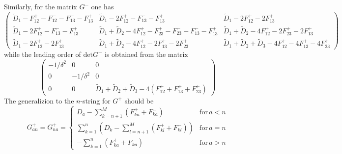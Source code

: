 \documentclass[onecolumn,superscriptaddress,pr]{revtex4}
\begin{document}
% 
Similarly, for the matrix $G^-$ one has 
%
\begin{equation}
\left(\begin{array}{ccc}
\tilde D_1-F_{12}^+-F_{12}^--F_{13}^--F_{13}^+   &    \tilde D_1-2F_{12}^+-F_{13}^--F_{13}^+                                      &   \tilde D_1-2F_{12}^+-2F_{13}^+\\
\tilde D_1-2F_{12}^+-F_{13}^--F_{13}^+           &    \tilde D_1+\tilde D_2-4F_{12}^+-F_{23}^+-F_{23}^--F_{13}^--F_{13}^+         &   \tilde D_1+\tilde D_2 -4F_{12}^+-2F_{23}^+-2F_{13}^+\\
\tilde D_1 -2F_{12}^+ -2F_{13}^+                 &     \tilde D_1+\tilde D_2 -4F_{12}^+-2F_{13}^+-2F_{23}^+                       &   \tilde D_1+\tilde D_2+\tilde D_3 -4F_{12}^+-4F_{13}^+-4F_{23}^+
\end{array}
\right)
\end{equation}
% 
while the leading order of $\textrm{det}G^-$ is obtained from the matrix 
%
\begin{equation}
\left(\begin{array}{ccc}
-1/\delta^2 & 0 & 0\\
0 & -1/\delta^2 & 0 \\
0 & 0 & \tilde D_1+\tilde D_2+\tilde D_3 -4(F_{12}^++F_{13}^++F_{23}^+)
\end{array}
\right)
\end{equation}
% 
The generalizion to the $n$-string for $G^+$ should be  
%
\begin{equation}
G^+_{an}=G_{na}^+=\left\{
\begin{array}{cc}
D_a-\sum\limits_{k=n+1}^M (F^+_{ka}+F^-_{ka}) & \textrm{for}\, a<n\\
\sum\limits_{k=1}^n(D_k-\sum\limits_{l=n+1}^M(F^+_{kl}+F^-_{kl})) & \textrm{for}\, a=n\\
-\sum\limits_{k=1}^n(F^+_{ka}+F^-_{ka}) & \textrm{for}\, a>n
\end{array}
\right.
\end{equation}
%
%
\end{document}
